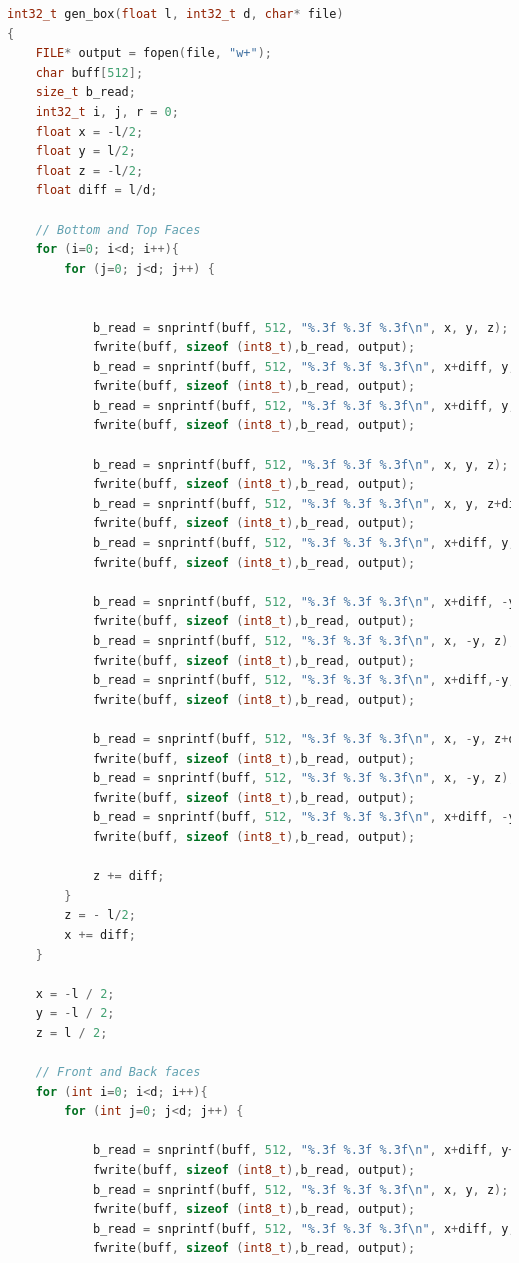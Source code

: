 \documentclass[14pt, a4 paper]{article}
\begin{document}
\begin{lstlisting}[language=c++]
int32_t gen_box(float l, int32_t d, char* file) 
{
	FILE* output = fopen(file, "w+");
	char buff[512];
	size_t b_read;
	int32_t i, j, r = 0;
	float x = -l/2;
	float y = l/2;
	float z = -l/2;
	float diff = l/d;

    // Bottom and Top Faces
	for (i=0; i<d; i++){
		for (j=0; j<d; j++) {
			

			b_read = snprintf(buff, 512, "%.3f %.3f %.3f\n", x, y, z);
			fwrite(buff, sizeof (int8_t),b_read, output);
			b_read = snprintf(buff, 512, "%.3f %.3f %.3f\n", x+diff, y, z+diff);
			fwrite(buff, sizeof (int8_t),b_read, output);
			b_read = snprintf(buff, 512, "%.3f %.3f %.3f\n", x+diff, y, z);
			fwrite(buff, sizeof (int8_t),b_read, output);

			b_read = snprintf(buff, 512, "%.3f %.3f %.3f\n", x, y, z);
			fwrite(buff, sizeof (int8_t),b_read, output);
			b_read = snprintf(buff, 512, "%.3f %.3f %.3f\n", x, y, z+diff);
			fwrite(buff, sizeof (int8_t),b_read, output);
			b_read = snprintf(buff, 512, "%.3f %.3f %.3f\n", x+diff, y, z+diff);
			fwrite(buff, sizeof (int8_t),b_read, output);

			b_read = snprintf(buff, 512, "%.3f %.3f %.3f\n", x+diff, -y, z+diff);
			fwrite(buff, sizeof (int8_t),b_read, output);
			b_read = snprintf(buff, 512, "%.3f %.3f %.3f\n", x, -y, z);
			fwrite(buff, sizeof (int8_t),b_read, output);
			b_read = snprintf(buff, 512, "%.3f %.3f %.3f\n", x+diff,-y, z);
			fwrite(buff, sizeof (int8_t),b_read, output);

			b_read = snprintf(buff, 512, "%.3f %.3f %.3f\n", x, -y, z+diff);
			fwrite(buff, sizeof (int8_t),b_read, output);
			b_read = snprintf(buff, 512, "%.3f %.3f %.3f\n", x, -y, z);
			fwrite(buff, sizeof (int8_t),b_read, output);
			b_read = snprintf(buff, 512, "%.3f %.3f %.3f\n", x+diff, -y, z+diff);
			fwrite(buff, sizeof (int8_t),b_read, output);

			z += diff;
		}
		z = - l/2;
		x += diff;
	}

	x = -l / 2;
	y = -l / 2;
	z = l / 2;

    // Front and Back faces
	for (int i=0; i<d; i++){
		for (int j=0; j<d; j++) {

			b_read = snprintf(buff, 512, "%.3f %.3f %.3f\n", x+diff, y+diff, z);
			fwrite(buff, sizeof (int8_t),b_read, output);
			b_read = snprintf(buff, 512, "%.3f %.3f %.3f\n", x, y, z);
			fwrite(buff, sizeof (int8_t),b_read, output);
			b_read = snprintf(buff, 512, "%.3f %.3f %.3f\n", x+diff, y, z);
			fwrite(buff, sizeof (int8_t),b_read, output);


\end{lstlisting}
\end{document}
